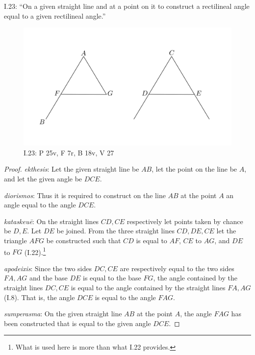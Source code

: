 \documentclass{article}
\begin{document}
I.23: ``On a given straight line and at a point on it to construct a 
rectilineal angle equal to a given rectilineal angle.''

\begin{figure}
\begin{center}
\includegraphics[width=\textwidth]{I23.png}
\end{center}
\caption{I.23: P 25v, F 7r, B 18v, V 27}
\label{I23}
\end{figure}

\begin{proof}
{\em ekthesis}: Let the given straight line be $AB$, let the  point on the line be $A$,  and let the given angle be $DCE$.

{\em diorismos}: Thus it is required to construct on the line $AB$ at the point $A$ an angle equal to the angle $DCE$.

{\em kataskeu\={e}}: On the straight lines $CD,CE$ respectively let points taken by chance be $D,E$. 
Let $DE$ be joined. From the three straight lines $CD,DE,CE$ let the triangle $AFG$ be constructed such that $CD$ is equal to $AF$,
$CE$ to $AG$, and $DE$ to $FG$ (I.22).\footnote{What is used here is more than what I.22 provides.}

{\em apodeixis}: Since the two sides $DC,CE$ are respectively equal to the two sides $FA,AG$ and the base $DE$ is equal to the base
$FG$, the angle contained by the straight lines $DC,CE$ is equal to the angle contained by the straight lines
$FA,AG$ (I.8). That is, the angle $DCE$ is equal to the angle $FAG$.

{\em sumperasma}: On the given straight line $AB$ at the point $A$, the angle $FAG$ has been constructed that is equal to the given
angle $DCE$.
\end{proof}
\end{document}
